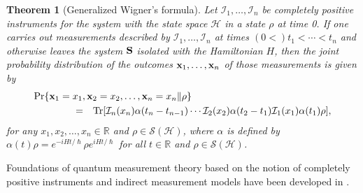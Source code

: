 \documentclass[12pt]{article}
\newcommand{\beqa}{\begin{eqnarray}}
\newcommand{\eeqa}{\end{eqnarray}}
\newcommand{\bS}{{\bf S}}
\newcommand{\cH}{{\mathcal H}}
\newcommand{\cI}{{\mathcal I}}
\newcommand{\cS}{{\mathcal S}}
\newcommand{\al}{\alpha}
\newcommand{\nn}{\nonumber}
\newcommand{\rh}{\rho}
\newcommand{\Tr}{\mbox{\rm Tr}}
\newcommand{\bx}{{\bf x}}
\newtheorem{Theorem}{Theorem}
\newcommand{\R}{\mathbb{R}}
\begin{document}
\begin{Theorem}[Generalized Wigner's formula]
Let $\cI_{1},\ldots,\cI_{n}$ be completely positive 
instruments for the system with
the state space $\cH$  in a state $\rh$ at time 0.
If one carries out measurements described by $\cI_{1},\ldots,\cI_{n}$  
at times $(0<)t_{1}<\cdots<t_{n}$ and otherwise leaves the system $\bS$ isolated
with the Hamiltonian $H$,
then the joint probability distribution of the outcomes 
$\bx_{1},\ldots,\bx_{n}$ of those measurements is given by
\beqa
\lefteqn{\Pr\{\bx_{1}=x_1,\bx_{2}=x_2,\ldots,\bx_{n}=x_n\|\rh\}}
\qquad\qquad\nn\\
&=&
\Tr[\cI_{n}(x_{n})\al(t_{n}-t_{n-1})\cdots
\cI_{2}(x_2)\al(t_{2}-t_{1})\cI_{1}(x_1)\al(t_{1})\rh],
\eeqa
for any $x_1,x_2,\ldots,x_n\in\R$ and $\rh\in\cS(\cH)$,
where $\al$ is defined by 
$\al(t)\rh=e^{-iHt/\hslash}\rh e^{iHt/\hslash}$ for all 
$t\in\R$ and $\rh\in\cS(\cH)$. 
\end{Theorem}

Foundations of quantum measurement theory
based on the notion of completely positive instruments and indirect measurement models 
have been developed in  
\cite{83CR,84QC,85CA,85CC,86IQ,88MR,88MS,89RS,90QP,91QU,93CA,95MM,97QQ,97OQ,%
98QS,00MN,01OD,04URN,05PCN,06QPC,19A1}.
 
\end{document}
